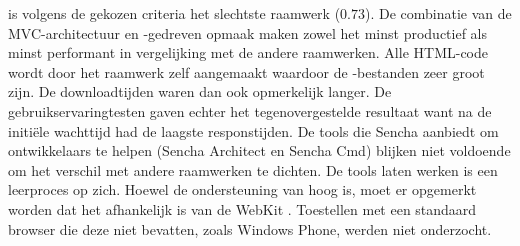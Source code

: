 
\st{} is volgens de gekozen criteria het slechtste raamwerk ($0.73$).
De combinatie van de MVC-architectuur en \js-gedreven opmaak maken \st{} zowel het minst productief als minst performant in vergelijking met de andere raamwerken.
Alle HTML-code wordt door het raamwerk zelf aangemaakt waardoor de \js-bestanden zeer groot zijn.
De downloadtijden waren dan ook opmerkelijk langer.
De gebruikservaringtesten gaven echter het tegenovergestelde resultaat want na de initiële wachttijd had \st{} de laagste responstijden.
De tools die Sencha aanbiedt om ontwikkelaars te helpen (Sencha Architect en Sencha Cmd) blijken niet voldoende om het verschil met andere raamwerken te dichten.
De tools laten werken is een leerproces op zich.
Hoewel de ondersteuning van \st{} hoog is, moet er opgemerkt worden dat het afhankelijk is van de WebKit .
Toestellen met een standaard browser die deze  niet bevatten, zoals Windows Phone,  werden niet onderzocht.














